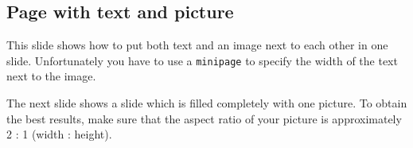 \documentclass[a4paper]{article}            %
\begin{document}
\begin{slidetop}


\begin{minipage}{12cm}   %
\section*{Page with text and picture}

This slide shows how to put both text and an image next to each other in one slide. Unfortunately you have to use a \verb|minipage| to specify the width of the text next to the image.

The next slide shows a slide which is filled completely with one picture. To obtain the best results, make sure that the aspect ratio of your picture is approximately 2 : 1 (width : height).
\end{minipage}
\end{slidetop}
\end{document}
